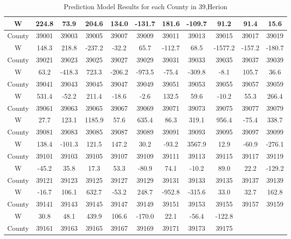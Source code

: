 \documentclass[12pt]{mcmthesis}
\begin{document}
\begin{table}[htbp]
\centering
\caption{Prediction Model Results for each County in 39,Herion}\label{results11}
\begin{tabular}{|c|c|c|c|c|c|c|c|c|c|c|}
  \hline
W      & 224.8 & 73.9   & 204.6  & 134.0  & -131.7 & 181.6  & -109.7 & 91.2    & 91.4   & 15.6   \\ \hline
County & 39001 & 39003  & 39005  & 39007  & 39009  & 39011  & 39013  & 39015   & 39017  & 39019  \\ \hline
W      & 148.3 & 218.8  & -237.2 & -32.2  & 65.7   & -112.7 & 68.5   & -1577.2 & -157.2 & -180.7 \\ \hline
County & 39021 & 39023  & 39025  & 39027  & 39029  & 39031  & 39033  & 39035   & 39037  & 39039  \\ \hline
W      & 63.2  & -418.3 & 723.3  & -206.2 & -973.5 & -75.4  & -309.8 & -8.1    & 105.7  & 36.6   \\ \hline
County & 39041 & 39043  & 39045  & 39047  & 39049  & 39051  & 39053  & 39055   & 39057  & 39059  \\ \hline
W      & 531.4 & -52.2  & 211.4  & -18.6  & -2.6   & 132.5  & 59.6   & -10.2   & 55.3   & 266.4  \\ \hline
County & 39061 & 39063  & 39065  & 39067  & 39069  & 39071  & 39073  & 39075   & 39077  & 39079  \\ \hline
W      & 27.7  & 123.1  & 1185.9 & 57.6   & 635.4  & 86.3   & 319.1  & 956.4   & -75.4  & 338.7  \\ \hline
County & 39081 & 39083  & 39085  & 39087  & 39089  & 39091  & 39093  & 39095   & 39097  & 39099  \\ \hline
W      & 138.4 & -101.3 & 121.5  & 147.2  & 30.2   & -93.2  & 3567.9 & 12.9    & -60.9  & -276.1 \\ \hline
County & 39101 & 39103  & 39105  & 39107  & 39109  & 39111  & 39113  & 39115   & 39117  & 39119  \\ \hline
W      & -45.2 & 35.8   & 17.3   & 53.3   & -80.9  & 74.1   & -10.2  & 89.0    & 22.2   & -129.2 \\ \hline
County & 39121 & 39123  & 39125  & 39127  & 39129  & 39131  & 39133  & 39135   & 39137  & 39139  \\ \hline
W      & -16.7 & 106.1  & 632.7  & -53.2  & 248.7  & -952.8 & -315.6 & 33.0    & 32.7   & 162.8  \\ \hline
County & 39141 & 39143  & 39145  & 39147  & 39149  & 39151  & 39153  & 39155   & 39157  & 39159  \\ \hline
W      & 30.8  & 48.1   & 439.9  & 106.6  & -170.0 & 22.1   & -56.4  & -122.8  &        &        \\ \hline
County & 39161 & 39163  & 39165  & 39167  & 39169  & 39171  & 39173  & 39175   &        &        \\ \hline
\end{tabular}
\end{table}
\end{document}
